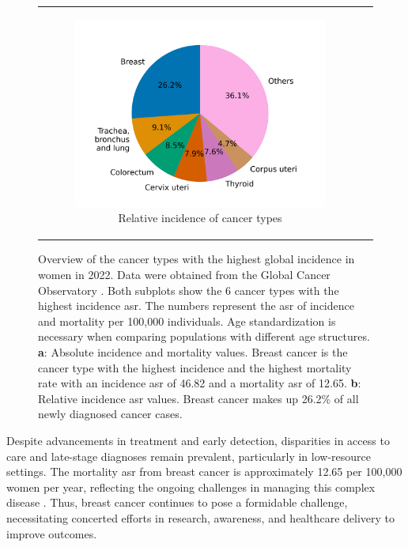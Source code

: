 \begin{figure}[ht]
\begin{tabular}{cc}
\begin{subfigure}{0.5\textwidth}
            \includegraphics[width=\linewidth]{chapters/2_background/figures/pie.png}
            \caption{Relative incidence of cancer types}
            \label{fig:brca_pie}
        \end{subfigure} \end{tabular} \caption{Overview of the cancer types
        with the highest global incidence in women in 2022.
        Data were obtained from the Global Cancer Observatory
        \supercite{bray_global_2024,ferlay_global_2024}.
        Both subplots show the 6 cancer types with the highest incidence \gls{asr}.
        The numbers represent the \gls{asr} of incidence and mortality per 100,000
        individuals.
        Age standardization is necessary when comparing populations with different age
        structures\supercite{segi_age-adjusted_1960,doll_cancer_1966}.
        \textbf{a}: Absolute incidence and mortality values.
        Breast cancer is the cancer type with the highest incidence and the highest
        mortality rate with an incidence \gls{asr} of 46.82 and a mortality \gls{asr}
        of 12.65.
        \textbf{b}: Relative incidence \gls{asr} values.
        Breast cancer makes up 26.2\% of all newly diagnosed cancer cases.
    }
    \label{fig:brca_incidence_mortality} \end{figure}

Despite advancements in treatment and early detection, disparities in access to
care and late-stage diagnoses remain prevalent, particularly in low-resource
settings\supercite{wilkinson_understanding_2022,ginsburg_breast_2020}.
The mortality \gls{asr} from breast cancer is approximately 12.65 per 100,000
women per year, reflecting the ongoing challenges in managing this complex
disease \supercite{bray_global_2024,ferlay_global_2024}.
Thus, breast cancer continues to pose a formidable challenge, necessitating
concerted efforts in research, awareness, and healthcare delivery to improve
outcomes\supercite{desantis_breast_2019}.

